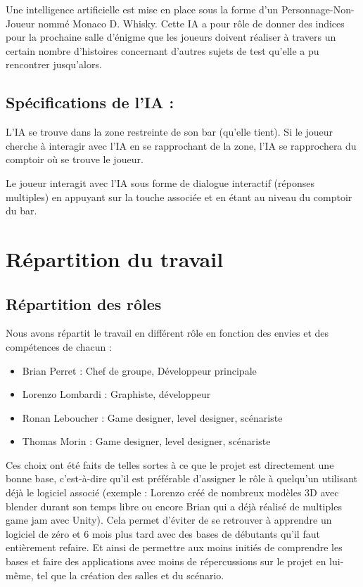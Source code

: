 \documentclass[a4paper,11pt]{article}
\begin{document}
Une intelligence artificielle est mise en place sous la 
forme d’un Personnage-Non-Joueur nommé Monaco D. Whisky. 
Cette IA a pour rôle de donner des indices pour la prochaine salle d’énigme que les 
joueurs doivent réaliser à travers un certain nombre d’histoires concernant d’autres sujets de 
test qu’elle a pu rencontrer jusqu’alors.


\subsection{Spécifications de l’IA :}

L’IA se trouve dans la zone restreinte de son bar (qu’elle tient). Si le joueur cherche à 
interagir avec l’IA en se rapprochant de la zone, l’IA se rapprochera du comptoir où se trouve le joueur.\newline

Le joueur interagit avec l’IA sous forme de dialogue interactif (réponses multiples) 
en appuyant sur la touche associée et en étant au niveau du comptoir du bar.


\section{Répartition du travail}

\subsection{Répartition des rôles}

Nous avons répartit le travail en différent rôle en fonction des envies 
et des compétences de chacun :\newline

\begin{itemize}
    \item Brian Perret : Chef de groupe, Développeur principale 
    \item Lorenzo Lombardi : Graphiste, développeur
    \item Ronan Leboucher : Game designer, level designer, scénariste
    \item Thomas Morin : Game designer, level designer, scénariste\newline
\end{itemize}

Ces choix ont été faits de telles sortes à ce que le projet est directement une bonne base, 
c’est-à-dire qu’il est préférable d’assigner le rôle à quelqu'un utilisant déjà le logiciel 
associé (exemple : Lorenzo créé de nombreux modèles 3D avec blender durant son temps libre ou encore
 Brian qui a déjà réalisé de multiples game jam avec Unity). Cela permet d'éviter de se retrouver à 
 apprendre un logiciel de zéro et 6 mois plus tard avec des bases de débutants qu’il faut entièrement refaire.
Et ainsi de permettre aux moins initiés de comprendre les bases et faire des applications avec 
moins de répercussions sur le projet en lui-même, tel que la création des salles et du scénario.
\end{document}
